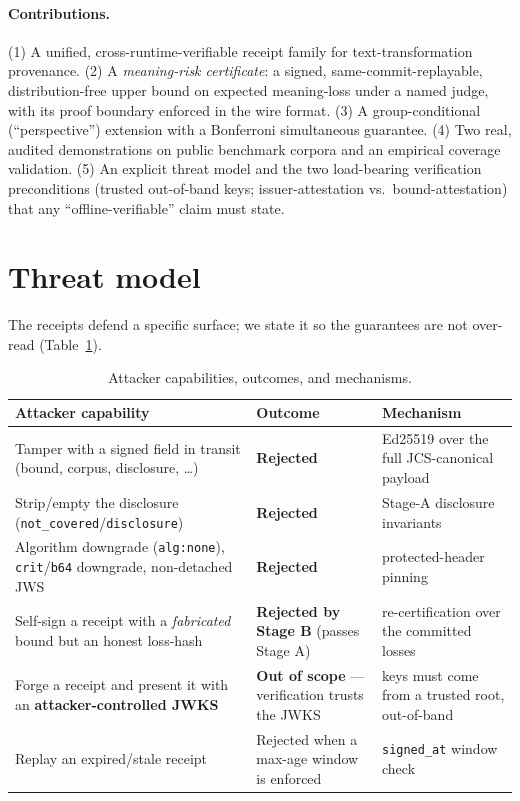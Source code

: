 \documentclass[11pt]{article}
\theoremstyle{definition}
\begin{document}
\paragraph{Contributions.}
(1) A unified, cross-runtime-verifiable receipt family for
text-transformation provenance. (2) A \emph{meaning-risk certificate}: a
signed, same-commit-replayable, distribution-free upper bound on expected
meaning-loss under a named judge, with its proof boundary enforced in the
wire format. (3) A group-conditional (``perspective'') extension with a
Bonferroni simultaneous guarantee. (4) Two real, audited demonstrations on public
benchmark corpora and an empirical coverage validation. (5) An explicit threat
model and the two load-bearing verification preconditions (trusted
out-of-band keys; issuer-attestation vs.\ bound-attestation) that any
``offline-verifiable'' claim must state.

\section{Threat model}\label{sec:threat}

The receipts defend a specific surface; we state it so the guarantees are
not over-read (Table~\ref{tab:threat}).

\begin{table}[htbp]
\centering
\small
\begin{tabular}{@{}p{}p{}p{}@{}}
\toprule
\textbf{Attacker capability} & \textbf{Outcome} & \textbf{Mechanism} \\
\midrule
Tamper with a signed field in transit (bound, corpus, disclosure, \dots) &
\textbf{Rejected} &
Ed25519 over the full JCS-canonical payload \\
\addlinespace
Strip/empty the disclosure (\texttt{not\_covered}/\texttt{disclosure}) &
\textbf{Rejected} &
Stage-A disclosure invariants \\
\addlinespace
Algorithm downgrade (\texttt{alg:none}), \texttt{crit}/\texttt{b64}
downgrade, non-detached JWS &
\textbf{Rejected} &
protected-header pinning \\
\addlinespace
Self-sign a receipt with a \emph{fabricated} bound but an honest loss-hash &
\textbf{Rejected by Stage B} (passes Stage A) &
re-certification over the committed losses \\
\addlinespace
Forge a receipt and present it with an \textbf{attacker-controlled JWKS} &
\textbf{Out of scope} --- verification trusts the JWKS &
keys must come from a trusted root, out-of-band \\
\addlinespace
Replay an expired/stale receipt &
Rejected when a max-age window is enforced &
\texttt{signed\_at} window check \\
\bottomrule
\end{tabular}
\caption{Attacker capabilities, outcomes, and mechanisms.}
\label{tab:threat}
\end{table}
\end{document}
